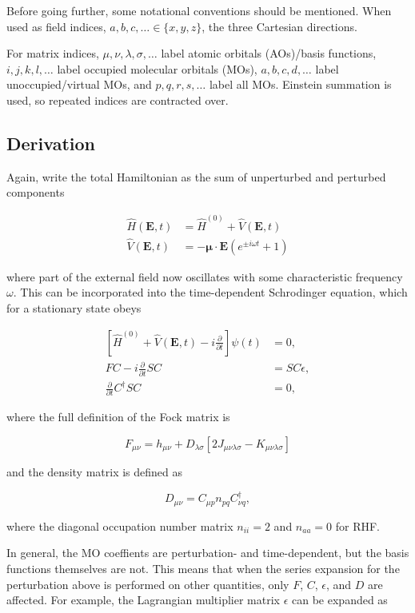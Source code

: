 \documentclass[11pt]{article}
\begin{document}
Before going further, some notational conventions should be mentioned.
When used as field indices, \(a,b,c,\dots \in \{x,y,z\}\), the three
Cartesian directions.

For matrix indices, \(\mu,\nu,\lambda,\sigma,\dots\) label atomic
orbitals (AOs)/basis functions, \(i,j,k,l,\dots\) label occupied
molecular orbitals (MOs), \(a,b,c,d,\dots\) label unoccupied/virtual
MOs, and \(p,q,r,s,\dots\) label all MOs. Einstein summation is used, so
repeated indices are contracted over.

\hypertarget{derivation}{%
\subsection{Derivation}\label{derivation}}

Again, write the total Hamiltonian as the sum of unperturbed and
perturbed components

\begin{align}
\hat{H}(\mathbf{E},t) &= \hat{H}^{(0)} + \hat{V}(\mathbf{E},t) \\
\hat{V}(\mathbf{E},t) &= -\mathbf{\mu} \cdot \mathbf{E}(e^{\pm i \omega t} + 1)
\end{align}

where part of the external field now oscillates with some characteristic
frequency \(\omega\). This can be incorporated into the time-dependent
Schrodinger equation, which for a stationary state obeys

\begin{align}
\left[ \hat{H}^{(0)} + \hat{V}(\mathbf{E},t) - i\frac{\partial}{\partial t} \right] \psi(t) &= 0, \\
FC - i \frac{\partial}{\partial t} SC &= SC\epsilon, \\
\frac{\partial}{\partial t} C^{\dagger} S C &= 0,
\end{align}

where the full definition of the Fock matrix is

\[
F_{\mu\nu} = h_{\mu\nu} + D_{\lambda\sigma}[2J_{\mu\nu\lambda\sigma} - K_{\mu\nu\lambda\sigma}]
\]

and the density matrix is defined as

\[
D_{\mu\nu} = C_{\mu p}n_{pq}C_{\nu q}^{\dagger},
\]

where the diagonal occupation number matrix \(n_{ii} = 2\) and
\(n_{aa} = 0\) for RHF.

In general, the MO coeffients are perturbation- and time-dependent, but
the basis functions themselves are not. This means that when the series
expansion for the perturbation above is performed on other quantities,
only \(F\), \(C\), \(\epsilon\), and \(D\) are affected. For example,
the Lagrangian multiplier matrix \(\epsilon\) can be expanded as
\end{document}
